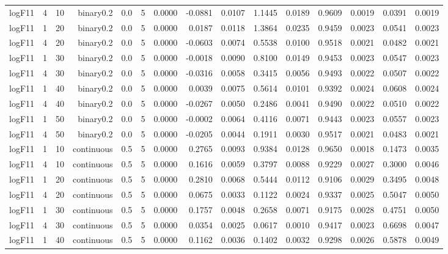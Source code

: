 \begin{longtable}{rrrrrrrrrrrrrrr}
  logF11 & 4 & 10 & binary0.2 & 0.0 & 5 & 0.0000 & -0.0881 & 0.0107 & 1.1445 & 0.0189 & 0.9609 & 0.0019 & 0.0391 & 0.0019 \\ 
  logF11 & 1 & 20 & binary0.2 & 0.0 & 5 & 0.0000 & 0.0187 & 0.0118 & 1.3864 & 0.0235 & 0.9459 & 0.0023 & 0.0541 & 0.0023 \\ 
  logF11 & 4 & 20 & binary0.2 & 0.0 & 5 & 0.0000 & -0.0603 & 0.0074 & 0.5538 & 0.0100 & 0.9518 & 0.0021 & 0.0482 & 0.0021 \\ 
  logF11 & 1 & 30 & binary0.2 & 0.0 & 5 & 0.0000 & -0.0018 & 0.0090 & 0.8100 & 0.0149 & 0.9453 & 0.0023 & 0.0547 & 0.0023 \\ 
  logF11 & 4 & 30 & binary0.2 & 0.0 & 5 & 0.0000 & -0.0316 & 0.0058 & 0.3415 & 0.0056 & 0.9493 & 0.0022 & 0.0507 & 0.0022 \\ 
  logF11 & 1 & 40 & binary0.2 & 0.0 & 5 & 0.0000 & 0.0039 & 0.0075 & 0.5614 & 0.0101 & 0.9392 & 0.0024 & 0.0608 & 0.0024 \\ 
  logF11 & 4 & 40 & binary0.2 & 0.0 & 5 & 0.0000 & -0.0267 & 0.0050 & 0.2486 & 0.0041 & 0.9490 & 0.0022 & 0.0510 & 0.0022 \\ 
  logF11 & 1 & 50 & binary0.2 & 0.0 & 5 & 0.0000 & -0.0002 & 0.0064 & 0.4116 & 0.0071 & 0.9443 & 0.0023 & 0.0557 & 0.0023 \\ 
  logF11 & 4 & 50 & binary0.2 & 0.0 & 5 & 0.0000 & -0.0205 & 0.0044 & 0.1911 & 0.0030 & 0.9517 & 0.0021 & 0.0483 & 0.0021 \\ 
  logF11 & 1 & 10 & continuous & 0.5 & 5 & 0.0000 & 0.2765 & 0.0093 & 0.9384 & 0.0128 & 0.9650 & 0.0018 & 0.1473 & 0.0035 \\ 
  logF11 & 4 & 10 & continuous & 0.5 & 5 & 0.0000 & 0.1616 & 0.0059 & 0.3797 & 0.0088 & 0.9229 & 0.0027 & 0.3000 & 0.0046 \\ 
  logF11 & 1 & 20 & continuous & 0.5 & 5 & 0.0000 & 0.2810 & 0.0068 & 0.5444 & 0.0112 & 0.9106 & 0.0029 & 0.3495 & 0.0048 \\ 
  logF11 & 4 & 20 & continuous & 0.5 & 5 & 0.0000 & 0.0675 & 0.0033 & 0.1122 & 0.0024 & 0.9337 & 0.0025 & 0.5047 & 0.0050 \\ 
  logF11 & 1 & 30 & continuous & 0.5 & 5 & 0.0000 & 0.1757 & 0.0048 & 0.2658 & 0.0071 & 0.9175 & 0.0028 & 0.4751 & 0.0050 \\ 
  logF11 & 4 & 30 & continuous & 0.5 & 5 & 0.0000 & 0.0354 & 0.0025 & 0.0617 & 0.0010 & 0.9417 & 0.0023 & 0.6698 & 0.0047 \\ 
  logF11 & 1 & 40 & continuous & 0.5 & 5 & 0.0000 & 0.1162 & 0.0036 & 0.1402 & 0.0032 & 0.9298 & 0.0026 & 0.5878 & 0.0049 \\ 

\end{longtable}

